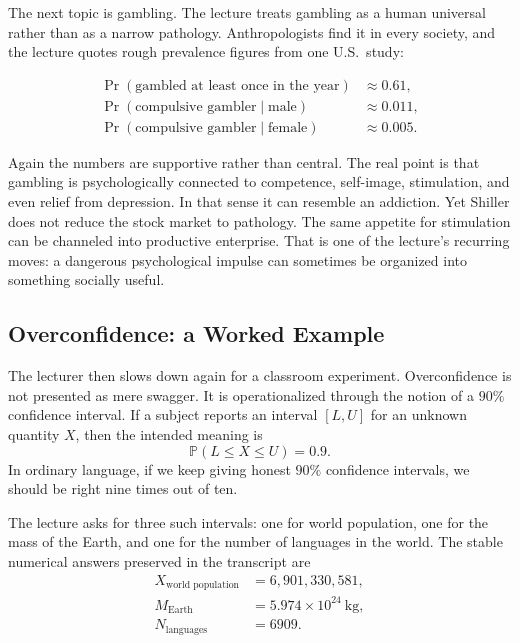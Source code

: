 The next topic is gambling. The lecture treats gambling as a human universal rather than as a narrow pathology. Anthropologists find it in every society, and the lecture quotes rough prevalence figures from one U.S.\ study:

\begin{align}
\Pr(\text{gambled at least once in the year}) &\approx 0.61,\\
\Pr(\text{compulsive gambler}\mid \text{male}) &\approx 0.011,\\
\Pr(\text{compulsive gambler}\mid \text{female}) &\approx 0.005.
\end{align}

Again the numbers are supportive rather than central. The real point is that gambling is psychologically connected to competence, self-image, stimulation, and even relief from depression. In that sense it can resemble an addiction. Yet Shiller does not reduce the stock market to pathology. The same appetite for stimulation can be channeled into productive enterprise. That is one of the lecture's recurring moves: a dangerous psychological impulse can sometimes be organized into something socially useful.

\subsection{Overconfidence: a Worked Example}

The lecturer then slows down again for a classroom experiment. Overconfidence is not presented as mere swagger. It is operationalized through the notion of a \(90\%\) confidence interval. If a subject reports an interval \([L,U]\) for an unknown quantity \(X\), then the intended meaning is
\begin{equation}
\mathbb{P}(L\le X\le U)=0.9.
\end{equation}
In ordinary language, if we keep giving honest \(90\%\) confidence intervals, we should be right nine times out of ten.

The lecture asks for three such intervals: one for world population, one for the mass of the Earth, and one for the number of languages in the world. The stable numerical answers preserved in the transcript are
\begin{align}
X_{\text{world population}} &= 6{,}901{,}330{,}581,\\
M_{\text{Earth}} &= 5.974\times 10^{24}\ \text{kg},\\
N_{\text{languages}} &= 6909.
\end{align}

